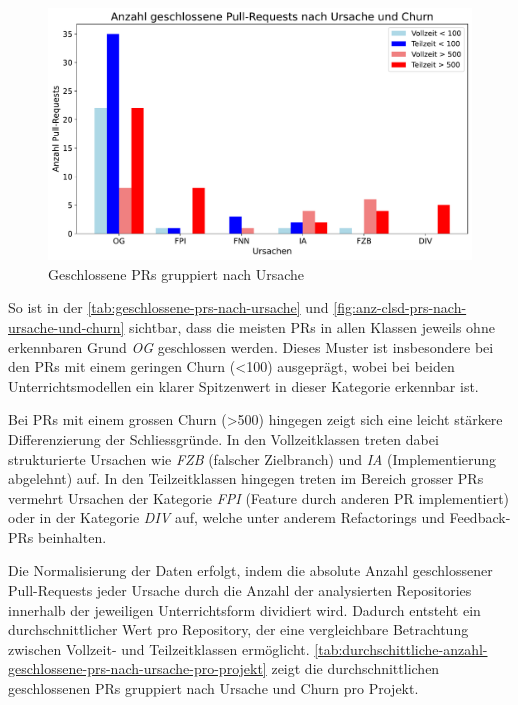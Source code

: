 \begin{figure}[htbp]
    \includegraphics[width=\textwidth]{Figures/ursachenanalyse.pdf}
    \caption{Geschlossene PRs gruppiert nach Ursache}
    \label{fig:anz-clsd-prs-nach-ursache-und-churn}
\end{figure}
So ist in der \autoref{tab:geschlossene-prs-nach-ursache} und \autoref{fig:anz-clsd-prs-nach-ursache-und-churn} sichtbar, dass die meisten PRs in allen Klassen jeweils ohne erkennbaren Grund \textit{OG} geschlossen werden. Dieses Muster ist insbesondere bei den PRs mit einem geringen Churn (<100) ausgeprägt, wobei bei beiden Unterrichtsmodellen ein klarer Spitzenwert in dieser Kategorie erkennbar ist.


Bei PRs mit einem grossen Churn (>500) hingegen zeigt sich eine leicht stärkere Differenzierung der Schliessgründe.
In den Vollzeitklassen treten dabei strukturierte Ursachen wie \textit{FZB} (falscher Zielbranch) und \textit{IA} (Implementierung abgelehnt) auf. 
In den Teilzeitklassen hingegen treten im Bereich grosser PRs vermehrt Ursachen der Kategorie \textit{FPI} (Feature durch anderen PR implementiert) oder in der Kategorie \textit{DIV} auf, welche unter anderem Refactorings und Feedback-PRs beinhalten.


Die Normalisierung der Daten erfolgt, indem die absolute Anzahl geschlossener Pull-Requests jeder Ursache durch die Anzahl der analysierten Repositories innerhalb der jeweiligen Unterrichtsform dividiert wird. Dadurch entsteht ein durchschnittlicher Wert pro Repository, der eine vergleichbare Betrachtung zwischen Voll\-zeit- und Teilzeitklassen ermöglicht. \autoref{tab:durchschittliche-anzahl-geschlossene-prs-nach-ursache-pro-projekt} zeigt die durchschnittlichen geschlossenen PRs gruppiert nach Ursache und Churn pro Projekt.  

